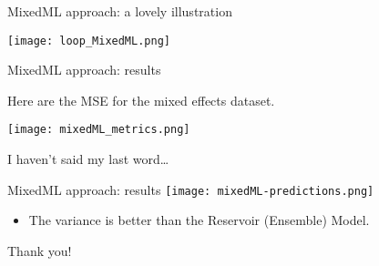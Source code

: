 \documentclass{beamer}
\begin{document}
\begin{frame}{MixedML approach: a lovely illustration}

\texttt{[image: loop\_MixedML.png]}

\end{frame}




\begin{frame}{MixedML approach: results}

Here are the MSE for the mixed effects dataset.
\medskip

\centering
\texttt{[image: mixedML\_metrics.png]}

\medskip

I haven't said my last word…

\end{frame}


\begin{frame}{MixedML approach: results}
\centering
\texttt{[image: mixedML-predictions.png]}

\begin{itemize}
\item The variance is better than the Reservoir (Ensemble) Model.
\end{itemize}

\end{frame}


\begin{frame}

\centering 
\huge{Thank you!}

\end{frame}
\end{document}
